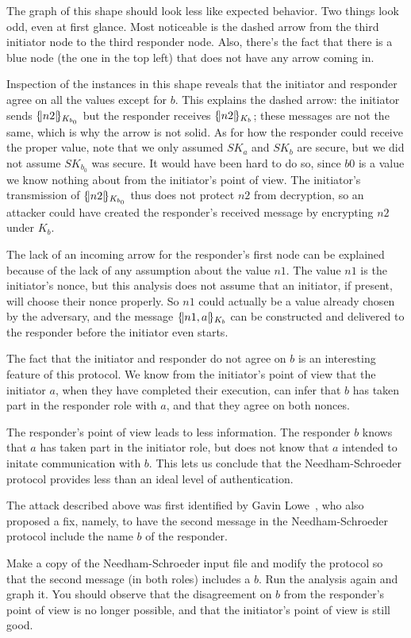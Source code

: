 The graph of this shape should look less like expected behavior.  Two
things look odd, even at first glance.  Most noticeable is the dashed
arrow from the third initiator node to the third responder node.
Also, there's the fact that there is a blue node (the one in the top
left) that does not have any arrow coming in.

Inspection of the instances in this shape reveals that the initiator
and responder agree on all the values except for $b$.  This explains
the dashed arrow: the initiator sends $\{\!|n2|\!\}_{K_{b_0}}$ but the
responder receives $\{\!|n2|\!\}_{K_b}$; these messages are not the same,
which is why the arrow is not solid.  As for how the responder could
receive the proper value, note that we only assumed $SK_a$ and $SK_b$
are secure, but we did not assume $SK_{b_0}$ was secure.  It would have
been hard to do so, since $b0$ is a value we know nothing about from
the initiator's point of view. The initiator's transmission of
$\{\!|n2|\!\}_{K_{b_0}}$ thus does not protect $n2$ from decryption, so an
attacker could have created the responder's received message by
encrypting $n2$ under $K_b$.

The lack of an incoming arrow for the responder's first node can be
explained because of the lack of any assumption about the value $n1$.
The value $n1$ is the initiator's nonce, but this analysis does not
assume that an initiator, if present, will choose their nonce
properly.  So $n1$ could actually be a value already chosen by the
adversary, and the message $\{\!|n1,a|\!\}_{K_b}$ can be constructed and
delivered to the responder before the initiator even starts.

The fact that the initiator and responder do not agree on $b$ is an
interesting feature of this protocol.  We know from the initiator's
point of view that the initiator $a$, when they have completed their
execution, can infer that $b$ has taken part in the responder role
with $a$, and that they agree on both nonces.

The responder's point of view leads to less information.  The
responder $b$ knows that $a$ has taken part in the initiator role, but
does not know that $a$ intended to initate communication with $b$.
This lets us conclude that the Needham-Schroeder protocol provides
less than an ideal level of authentication.

\begin{exercise}
  The attack described above was first identified by Gavin
  Lowe~\cite{Lowe96a}, who also proposed a fix, namely, to have the
  second message in the Needham-Schroeder protocol include the name
  $b$ of the responder.

Make a copy of the Needham-Schroeder input file and modify the
protocol so that the second message (in both roles) includes a $b$.
Run the analysis again and graph it.  You should observe that the
disagreement on $b$ from the responder's point of view is no longer
possible, and that the initiator's point of view is still good.
\end{exercise}

